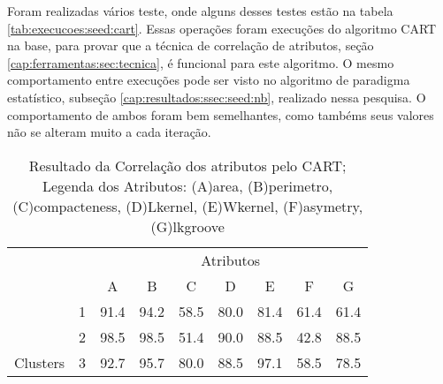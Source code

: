 Foram realizadas vários teste, onde alguns desses testes estão na tabela \ref{tab:execucoes:seed:cart}. Essas operações foram execuções do algoritmo CART na base, para provar que a técnica de correlação de atributos, seção \ref{cap:ferramentas:sec:tecnica}, é funcional para este algoritmo. O mesmo comportamento entre execuções pode ser visto no algoritmo de paradigma estatístico, subseção \ref{cap:resultados:ssec:seed:nb}, realizado nessa pesquisa. O  comportamento de ambos foram bem semelhantes, como tambéms seus valores não se alteram muito a cada iteração.


\begin{table}[!h]
    
    \caption{Resultado da Correlação dos atributos pelo CART; Legenda dos Atributos: (A)area, (B)perimetro, (C)compacteness, (D)Lkernel, (E)Wkernel, (F)asymetry, (G)lkgroove}    
    \centering
   \small\addtolength{\tabcolsep}{1pt}
    \begin{tabular}{|cl|c|c|c|c|c|c|c|}
        \hline \hline
                                &   & \multicolumn{7}{c|}{Atributos}          \\ \cline{3-9} 
        \multicolumn{1}{|l}{}                            &   & A    & B & C & D & E & F & G \\ \hline
        \multicolumn{1}{|c|}{}                           & 1 & 91.4 & 94.2   & 58.5      & 80.0 & 81.4 & 61.4   & 61.4   \\ \cline{2-9} 
        \multicolumn{1}{|c|}{}                           & 2 & 98.5 & 98.5   & 51.4      & 90.0 & 88.5 & 42.8  & 88.5  \\ \cline{2-9} 
        \multicolumn{1}{|c|}{\multirow{-3}{*}{Clusters}} & 3 & 92.7 & 95.7   & 80.0      & 88.5 & 97.1 & 58.5  & 78.5  \\ \hline
    \end{tabular}
    \label{tab:matrelevancia:seeds:cart} 
\end{table}

